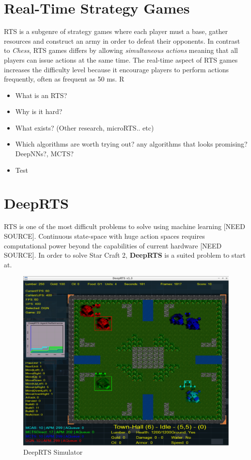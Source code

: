 \documentclass[fleqn,10pt]{article} %
\begin{document}
\section{Real-Time Strategy Games}
RTS is a subgenre of strategy games where each player must a base, gather resources and construct an army in order to defeat their opponents. In contrast to \textit{Chess}, RTS games differs by allowing \textit{simultaneous actions} meaning that all players can issue actions at the same time. The real-time aspect of RTS games increases the difficulty level because it encourage players to perform actions frequently, often as frequent as 50 ms. R


\begin{itemize}
    \item What is an RTS?
    \item Why is it hard?
    \item What exists? (Other research, microRTS.. etc)
    \item Which algorithms are worth trying out? any algorithms that looks promising? DeepNNs?, MCTS?
    \item Test
\end{itemize}


\section{DeepRTS}
RTS is one of the most difficult problems to solve using machine learning [NEED SOURCE]. Continuous state-space with huge action spaces requires computational power beyond the capabilities of current hardware [NEED SOURCE]. In order to solve Star Craft 2, \textbf{DeepRTS} is a suited problem to start at.


\begin{figure}[ht]\centering
\includegraphics[width=\linewidth]{deep_rts}
\caption{DeepRTS Simulator}
\label{fig:results}
\end{figure}
\end{document}
